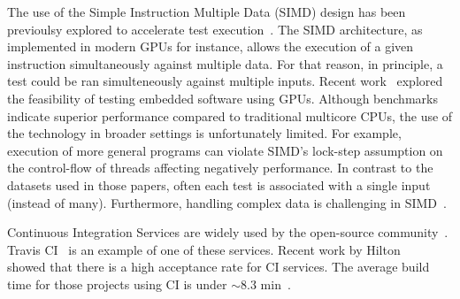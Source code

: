 The use of the Simple Instruction Multiple Data (SIMD) design has been
previoulsy explored to accelerate test
execution~\cite{damorim-etal-issta2007,damorim-etal-tse2008,kim-etal-issre2012,nguyen-etal-icse2014,rajan-etal-ase2014,sen-etal-fse2015,yaneva-etal-issta2017}. The
SIMD architecture, as implemented in modern GPUs for instance, allows
the execution of a given instruction simultaneously against multiple
data.  For that reason, in principle, a test could be ran
simulteneously against multiple inputs.  Recent
work~\cite{rajan-etal-ase2014,yaneva-etal-issta2017} explored the
feasibility of testing embedded software using GPUs.  Although
benchmarks indicate superior performance compared to traditional
multicore CPUs, the use of the technology in broader settings is
unfortunately limited. For example, execution of more general programs
can violate SIMD's lock-step assumption on the control-flow of threads
affecting negatively performance. In contrast to the datasets used in
those papers, often each test is associated with a single input
(instead of many).  Furthermore, handling complex data is challenging
in SIMD~\cite{damorim-etal-issta2007,damorim-etal-tse2008}.




Continuous Integration Services are widely used by the open-source
community~\cite{hilton-etal-ase2016,vasilescu-etal-fse2015}. Travis
CI~\cite{travis} is an example of one of these services. Recent work
by Hilton~\etal{}~\cite{hilton-etal-ase2016} showed that there is a
high acceptance rate for CI services. The average build time for those
projects using CI is under $\sim$8.3 min~\cite{hilton-etal-ase2016}. 


